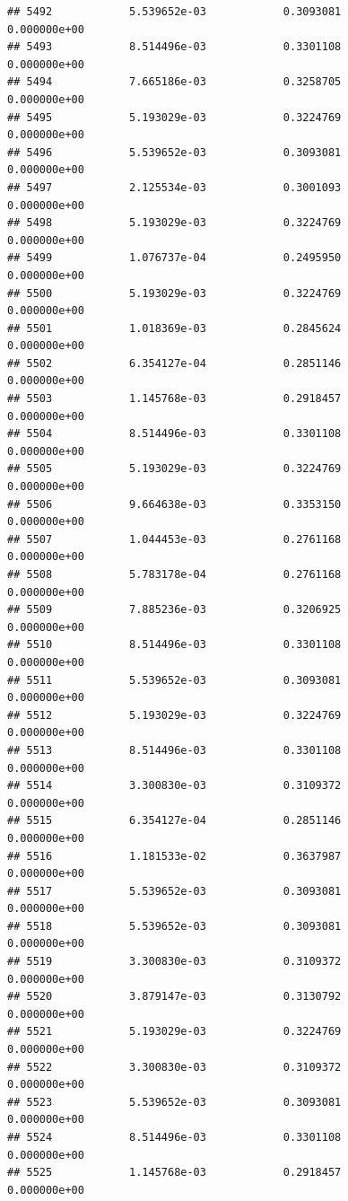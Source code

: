 \documentclass[
]{article}
\begin{document}
\begin{verbatim}
## 5492            5.539652e-03            0.3093081            0.000000e+00
## 5493            8.514496e-03            0.3301108            0.000000e+00
## 5494            7.665186e-03            0.3258705            0.000000e+00
## 5495            5.193029e-03            0.3224769            0.000000e+00
## 5496            5.539652e-03            0.3093081            0.000000e+00
## 5497            2.125534e-03            0.3001093            0.000000e+00
## 5498            5.193029e-03            0.3224769            0.000000e+00
## 5499            1.076737e-04            0.2495950            0.000000e+00
## 5500            5.193029e-03            0.3224769            0.000000e+00
## 5501            1.018369e-03            0.2845624            0.000000e+00
## 5502            6.354127e-04            0.2851146            0.000000e+00
## 5503            1.145768e-03            0.2918457            0.000000e+00
## 5504            8.514496e-03            0.3301108            0.000000e+00
## 5505            5.193029e-03            0.3224769            0.000000e+00
## 5506            9.664638e-03            0.3353150            0.000000e+00
## 5507            1.044453e-03            0.2761168            0.000000e+00
## 5508            5.783178e-04            0.2761168            0.000000e+00
## 5509            7.885236e-03            0.3206925            0.000000e+00
## 5510            8.514496e-03            0.3301108            0.000000e+00
## 5511            5.539652e-03            0.3093081            0.000000e+00
## 5512            5.193029e-03            0.3224769            0.000000e+00
## 5513            8.514496e-03            0.3301108            0.000000e+00
## 5514            3.300830e-03            0.3109372            0.000000e+00
## 5515            6.354127e-04            0.2851146            0.000000e+00
## 5516            1.181533e-02            0.3637987            0.000000e+00
## 5517            5.539652e-03            0.3093081            0.000000e+00
## 5518            5.539652e-03            0.3093081            0.000000e+00
## 5519            3.300830e-03            0.3109372            0.000000e+00
## 5520            3.879147e-03            0.3130792            0.000000e+00
## 5521            5.193029e-03            0.3224769            0.000000e+00
## 5522            3.300830e-03            0.3109372            0.000000e+00
## 5523            5.539652e-03            0.3093081            0.000000e+00
## 5524            8.514496e-03            0.3301108            0.000000e+00
## 5525            1.145768e-03            0.2918457            0.000000e+00

\end{verbatim}
\end{document}
